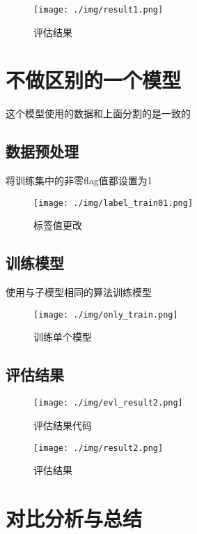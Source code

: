 \documentclass{article}
\begin{document}
\begin{figure}[H]
	\centering
	\texttt{[image: ./img/result1.png]}
	\caption{评估结果}
\end{figure}

\section{不做区别的一个模型}

这个模型使用的数据和上面分割的是一致的
\subsection{数据预处理}
将训练集中的非零flag值都设置为1
\begin{figure}[H]
	\centering
	\texttt{[image: ./img/label\_train01.png]}
	\caption{标签值更改}
\end{figure}

\subsection{训练模型}
使用与子模型相同的算法训练模型
\begin{figure}[H]
	\centering
	\texttt{[image: ./img/only\_train.png]}
	\caption{训练单个模型}
\end{figure}

\subsection{评估结果}

\begin{figure}[H]
	\centering
	\texttt{[image: ./img/evl\_result2.png]}
	\caption{评估结果代码}
\end{figure}

\begin{figure}[H]
	\centering
	\texttt{[image: ./img/result2.png]}
	\caption{评估结果}
\end{figure}

\section{对比分析与总结}
\end{document}
